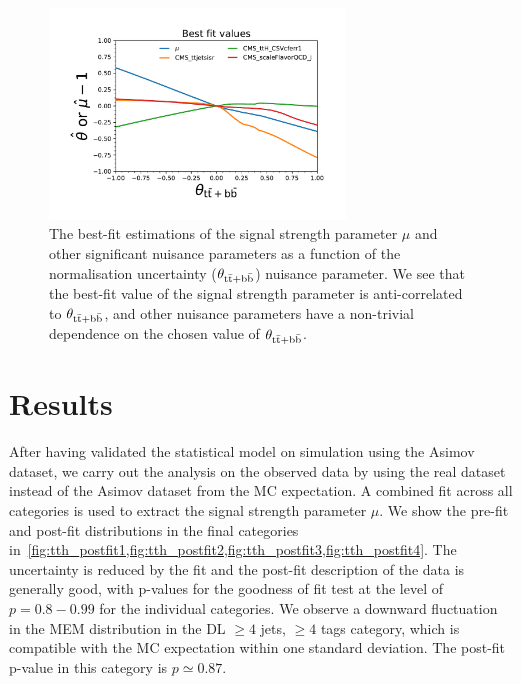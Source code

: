 \begin{figure}
\begin{centering}
\includegraphics[width = 0.7\textwidth]{figures/tth/nuis_scan.pdf}
\caption[The best-fit estimations of nuisance parameters as a function of the $\theta_{\ttbb}$ nuisance parameter]{The best-fit estimations of the signal strength parameter $\mu$ and other significant nuisance parameters as a function of the \ttbb\xspace normalisation uncertainty ($\theta_{\ttbb}$) nuisance parameter. We see that the best-fit value of the signal strength parameter is anti-correlated to $\theta_{\ttbb}$, and other nuisance parameters have a non-trivial dependence on the chosen value of $\theta_{\ttbb}$.}
\label{fig:tth_nuis_scan}
\end{centering}
\end{figure}

\section{Results}
\label{sec:tth_results}
After having validated the statistical model on simulation using the Asimov dataset, we carry out the analysis on the observed data by using the real dataset instead of the Asimov dataset from the MC expectation. A combined fit across all categories is used to extract the signal strength parameter $\mu$. We show the pre-fit and post-fit distributions in the final categories in~\cref{fig:tth_postfit1,fig:tth_postfit2,fig:tth_postfit3,fig:tth_postfit4}. The uncertainty is reduced by the fit and the post-fit description of the data is generally good, with p-values for the goodness of fit test at the level of $p=0.8-0.99$ for the individual categories. We observe a downward fluctuation in the MEM distribution in the DL $\geq4$ jets, $\geq4$ tags category, which is compatible with the MC expectation within one standard deviation. The post-fit p-value in this category is $p\simeq 0.87$.

